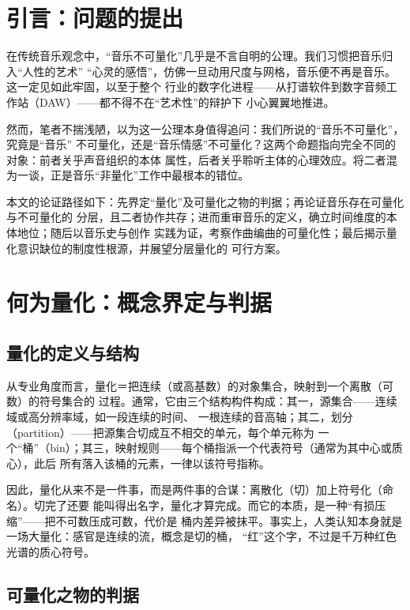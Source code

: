 \documentclass[11pt,a4paper,fontset=none]{ctexart}
\begin{document}
\section{引言：问题的提出}

在传统音乐观念中，“音乐不可量化”几乎是不言自明的公理。我们习惯把音乐归入“人性的艺术”
“心灵的感悟”，仿佛一旦动用尺度与网格，音乐便不再是音乐。这一定见如此牢固，以至于整个
行业的数字化进程——从打谱软件到数字音频工作站（DAW）——都不得不在“艺术性”的辩护下
小心翼翼地推进。

然而，笔者不揣浅陋，以为这一公理本身值得追问：我们所说的“音乐不可量化”，究竟是“音乐”
不可量化，还是“音乐情感”不可量化？这两个命题指向完全不同的对象：前者关乎声音组织的本体
属性，后者关乎聆听主体的心理效应。将二者混为一谈，正是音乐“非量化”工作中最根本的错位。

本文的论证路径如下：先界定“量化”及可量化之物的判据；再论证音乐存在可量化与不可量化的
分层，且二者协作共存；进而重审音乐的定义，确立时间维度的本体地位；随后以音乐史与创作
实践为证，考察作曲编曲的可量化性；最后揭示量化意识缺位的制度性根源，并展望分层量化的
可行方案。

\section{何为量化：概念界定与判据}

\subsection{量化的定义与结构}

从专业角度而言，量化＝把连续（或高基数）的对象集合，映射到一个离散（可数）的符号集合的
过程。通常，它由三个结构构件构成：其一，源集合——连续域或高分辨率域，如一段连续的时间、
一根连续的音高轴；其二，划分（partition）——把源集合切成互不相交的单元，每个单元称为
一个“桶”（bin）；其三，映射规则——每个桶指派一个代表符号（通常为其中心或质心），此后
所有落入该桶的元素，一律以该符号指称。

因此，量化从来不是一件事，而是两件事的合谋：离散化（切）加上符号化（命名）。切完了还要
能叫得出名字，量化才算完成。而它的本质，是一种“有损压缩”——把不可数压成可数，代价是
桶内差异被抹平。事实上，人类认知本身就是一场大量化：感官是连续的流，概念是切的桶，
“红”这个字，不过是千万种红色光谱的质心符号。

\subsection{可量化之物的判据}
\end{document}
